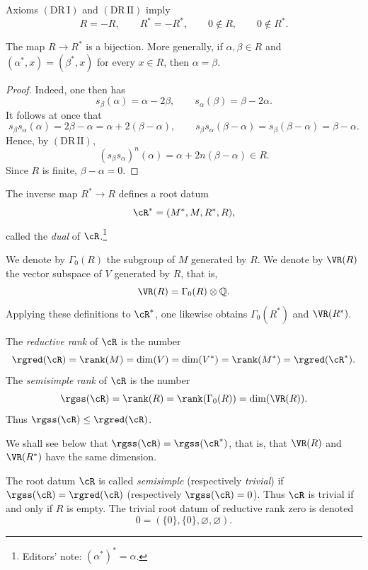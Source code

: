 \begin{remark}\label{sga3:XXI:1.1.3}
Axioms \((\mathrm{DR\,I})\) and \((\mathrm{DR\,II})\) imply
\[
 R=-R,\qquad R^\ast=-R^\ast,\qquad
 0\notin R,\qquad 0\notin R^\ast.
\]
\end{remark}

\begin{lemma}\label{sga3:XXI:1.1.4}
The map \(R\to R^\ast\) is a bijection. More generally, if
\(\alpha,\beta\in R\) and
\((\alpha^\ast,x)=(\beta^\ast,x)\) for every \(x\in R\), then
\(\alpha=\beta\).
\end{lemma}

\begin{proof}
Indeed, one then has
\[
 s_\beta(\alpha)=\alpha-2\beta,\qquad
 s_\alpha(\beta)=\beta-2\alpha.
\]
It follows at once that
\[
 s_\beta s_\alpha(\alpha)
   =2\beta-\alpha=\alpha+2(\beta-\alpha),\qquad
 s_\beta s_\alpha(\beta-\alpha)
   =s_\beta(\beta-\alpha)=\beta-\alpha.
\]
Hence, by \((\mathrm{DR\,II})\),
\[
 (s_\beta s_\alpha)^n(\alpha)
   =\alpha+2n(\beta-\alpha)\in R.
\]
Since \(R\) is finite, \(\beta-\alpha=0\).
\end{proof}

\begin{corollary}\label{sga3:XXI:1.1.5}
The inverse map \(R^\ast\to R\) defines a root datum
\[
 \cR^\ast=(M^\ast,M,R^\ast,R),
\]
called the \emph{dual} of \(\cR\).\footnote{Editors' note:
\((\alpha^\ast)^\ast=\alpha\).}
\end{corollary}

\begin{definition}\label{sga3:XXI:1.1.6}
We denote by \(\Gamma_0(R)\) the subgroup of \(M\) generated by \(R\).
We denote by \(\VR(R)\) the vector subspace of \(V\) generated by \(R\),
that is,
\[
 \VR(R)=\Gamma_0(R)\otimes\mathbb Q.
\]
Applying these definitions to \(\cR^\ast\), one likewise obtains
\(\Gamma_0(R^\ast)\) and \(\VR(R^\ast)\).

The \emph{reductive rank} of \(\cR\) is the number
\[
 \rgred(\cR)
 =\rank(M)=\dim(V)=\dim(V^\ast)=\rank(M^\ast)=\rgred(\cR^\ast).
\]
The \emph{semisimple rank} of \(\cR\) is the number
\[
 \rgss(\cR)
 =\rank(R)=\rank(\Gamma_0(R))=\dim(\VR(R)).
\]
Thus \(\rgss(\cR)\leq\rgred(\cR)\).

We shall see below that
\(\rgss(\cR)=\rgss(\cR^\ast)\), that is, that \(\VR(R)\) and
\(\VR(R^\ast)\) have the same dimension.
\end{definition}

\begin{definition}\label{sga3:XXI:1.1.7}\leavevmode\par
The root datum \(\cR\) is called \emph{semisimple} (respectively
\emph{trivial}) if
\(\rgss(\cR)=\rgred(\cR)\) (respectively \(\rgss(\cR)=0\)).
Thus \(\cR\) is trivial if and only if \(R\) is empty. The trivial root
datum of reductive rank zero is denoted
\[
 0=(\{0\},\{0\},\varnothing,\varnothing).
\]
\end{definition}

